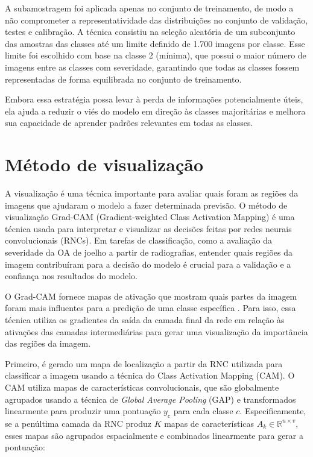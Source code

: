 A subamostragem foi aplicada apenas no conjunto de treinamento, de modo a não comprometer a representatividade das distribuições no conjunto de validação, testes e calibração. A técnica consistiu na seleção aleatória de um subconjunto das amostras das classes até um limite definido de 1.700 imagens por classe. Esse limite foi escolhido com base na classe 2 (mínima), que possui o maior número de imagens entre as classes com severidade, garantindo que todas as classes fossem representadas de forma equilibrada no conjunto de treinamento.

Embora essa estratégia possa levar à perda de informações potencialmente úteis, ela ajuda a reduzir o viés do modelo em direção às classes majoritárias e melhora sua capacidade de aprender padrões relevantes em todas as classes.

\section{Método de visualização}

A visualização é uma técnica importante para avaliar quais foram as regiões da imagens que ajudaram o modelo a fazer determinada previsão. O método de visualização Grad-CAM (Gradient-weighted Class Activation Mapping) é uma técnica usada para interpretar e visualizar as decisões feitas por redes neurais convolucionais (RNCs). Em tarefas de classificação, como a avaliação da severidade da OA de joelho a partir de radiografias, entender quais regiões da imagem contribuíram para a decisão do modelo é crucial para a validação e a confiança nos resultados do modelo.

O Grad-CAM fornece mapas de ativação que mostram quais partes da imagem foram mais influentes para a predição de uma classe específica \cite{Selvaraju2016}. Para isso, essa técnica utiliza os gradientes da saída da camada final da rede em relação às ativações das camadas intermediárias para gerar uma visualização da importância das regiões da imagem.

Primeiro, é gerado um mapa de localização a partir da RNC utilizada para classificar a imagem usando a técnica do Class Activation Mapping (CAM). O CAM utiliza mapas de características convolucionais, que são globalmente agrupados usando a técnica de \textit{Global Average Pooling} (GAP) e transformados linearmente para produzir uma pontuação \( y_c \) para cada classe \( c \). Especificamente, se a penúltima camada da RNC produz \( K \) mapas de características \( A_k \in \mathbb{R}^{u \times v} \), esses mapas são agrupados espacialmente e combinados linearmente para gerar a pontuação:

